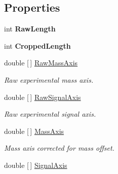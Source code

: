 \subsection*{Properties}
\begin{DoxyCompactItemize}
\item 
\mbox{\label{class_isotope_fit_1_1_i_f_data_1_1_spectrum_ae22a343962081fb1b7191f3df3634b00}} 
int {\bfseries Raw\+Length}
\item 
\mbox{\label{class_isotope_fit_1_1_i_f_data_1_1_spectrum_aa980205036330683b80606ca9d51df68}} 
int {\bfseries Cropped\+Length}
\item 
double \mbox{[}$\,$\mbox{]} \hyperlink{class_isotope_fit_1_1_i_f_data_1_1_spectrum_ac3297615e23a978626e4beaf9e040e2a}{Raw\+Mass\+Axis}
\begin{DoxyCompactList}\small\item\em Raw experimental mass axis. \end{DoxyCompactList}\item 
double \mbox{[}$\,$\mbox{]} \hyperlink{class_isotope_fit_1_1_i_f_data_1_1_spectrum_a948927d795db6a73eb1ddeac4f294cac}{Raw\+Signal\+Axis}
\begin{DoxyCompactList}\small\item\em Raw experimental signal axis. \end{DoxyCompactList}\item 
double \mbox{[}$\,$\mbox{]} \hyperlink{class_isotope_fit_1_1_i_f_data_1_1_spectrum_a4ed9378cb593bfffacaa3ac4411c039d}{Mass\+Axis}
\begin{DoxyCompactList}\small\item\em Mass axis corrected for mass offset. \end{DoxyCompactList}\item 
double \mbox{[}$\,$\mbox{]} \hyperlink{class_isotope_fit_1_1_i_f_data_1_1_spectrum_a561e2e683aee78aed97a967a68b474e9}{Signal\+Axis}

\end{DoxyCompactItemize}
